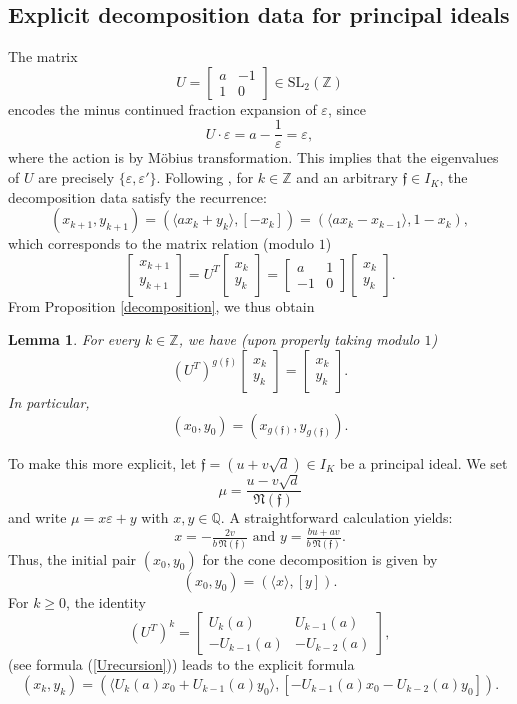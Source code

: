 \documentclass[11pt, a4paper]{amsart}
\newcommand{\mat}[1]{\begin{bmatrix}#1\end{bmatrix}}
\newcommand{\ep}{\varepsilon}
\newcommand{\eq}[1]{\begin{equation}#1\end{equation}}
\theoremstyle{plain}
\newtheorem{lemma}{Lemma}[section]
\numberwithin{equation}{section}
\begin{document}
 \subsection{Explicit decomposition data for principal ideals}
The matrix \eq{U = \begin{bmatrix} a & -1 \\ 1 & 0 \end{bmatrix} \in \mathrm{SL}_2(\mathbb Z)}
encodes the minus continued fraction expansion of $\ep$, since \eq{U \cdot \ep = a-\frac 1 \ep = \ep,} where the action is by Möbius transformation. This implies that the eigenvalues of $U$ are precisely $\{\ep,\ep'\}$. 
Following \cite{yamamoto2008kronecker}, for $k \in \mathbb Z$ and an arbitrary $\mathfrak f \in I_K$, the decomposition data satisfy the recurrence: \eq{\label{xyrecursion}(x_{k+1},y_{k+1}) = (\langle a x_k + y_k \rangle,[-x_k]) = (\langle a x_k -x_{k-1} \rangle,1-x_k),} which corresponds to the matrix relation (modulo $1$) \eq{\begin{bmatrix}x_{k+1} \\ y_{k+1} \end{bmatrix} = U^{T} \begin{bmatrix}x_k \\ y_k\end{bmatrix} = \begin{bmatrix}a & 1 \\ -1 & 0\end{bmatrix} \begin{bmatrix}x_k \\ y_k\end{bmatrix} .}
From Proposition \ref{decomposition}, we thus obtain 
\begin{lemma}
\label{LemmaPeriodic}
For every $k \in \mathbb Z$, we have (upon properly taking modulo $1$) \eq{(U^T)^{g(\mathfrak f)} \begin{bmatrix}x_k \\ y_k\end{bmatrix} = \begin{bmatrix}x_k \\ y_k\end{bmatrix}.} In particular, \eq{(x_0,y_0) = (x_{g(\mathfrak f)},y_{g(\mathfrak f)}).}
\end{lemma} 
\noindent  
To make this more explicit, let $\mathfrak f = (u + v \sqrt{d}) \in I_K$ be a principal ideal. We set \eq{\mu = \frac{u-v\sqrt{d}}{\mathfrak N(\mathfrak f)}} and write $\mu = x\ep + y$ with $x,y \in \mathbb Q$. A straightforward calculation yields: \eq{\label{denominators}x = -\tfrac{2 v}{b \, \mathfrak N(\mathfrak f)} \text{   and   } y = \tfrac{bu+av}{b \, \mathfrak N(\mathfrak f)}.} Thus, the initial pair $(x_0,y_0)$ for the cone decomposition is given by \eq{\label{initialu0}(x_0,y_0) = (\langle x \rangle,[y]).} For $k \geq 0$, the identity \eq{(U^T)^k = \mat{U_k(a)&U_{k-1}(a) \\ - U_{k-1}(a) & -U_{k-2}(a)},} (see formula (\ref{Urecursion})) leads to the explicit formula \eq{\label{generalformula}(x_k,y_k) = (\langle U_k(a) x_0 + U_{k-1}(a) y_0 \rangle,[-U_{k-1}(a) x_0 - U_{k-2}(a) y_0]).}
\end{document}
